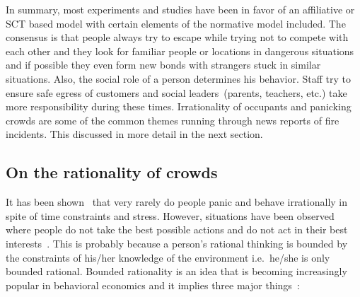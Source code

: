 
In summary, most experiments and studies have been in favor of an affiliative or SCT based model with certain elements of the normative model included. The consensus is that people always try to escape while trying not to compete with each other and they look for familiar people or locations in dangerous situations and if possible they even form new bonds with strangers stuck in similar situations. Also, the social role of a person determines his behavior. Staff try to ensure safe egress of customers and social leaders~(parents, teachers, etc.) take more responsibility during these times. Irrationality of occupants and panicking crowds are some of the common themes running through news reports of fire incidents. This discussed in more detail in the next section.

\subsection{On the rationality of crowds}
\label{LiteratureReview:RoleOfStress}

 It has been shown~\cite{Kobes:2009jx,Schadschneider:2008cz,Reicher:2008ep,Torres:2010tj,Paulsen:1984ti,Sime:1983uy} that very rarely do people panic and behave irrationally in spite of time constraints and stress. However, situations have been observed where people do not take the best possible actions and do not act in their best interests~\cite{Sandberg:1997tw}. This is probably because a person's rational thinking is bounded by the constraints of his/her knowledge of the environment i.e.\ he/she is only bounded rational. Bounded rationality is an idea that is becoming increasingly popular in behavioral economics and it implies three major things~\cite{Jones:1999tn}:


